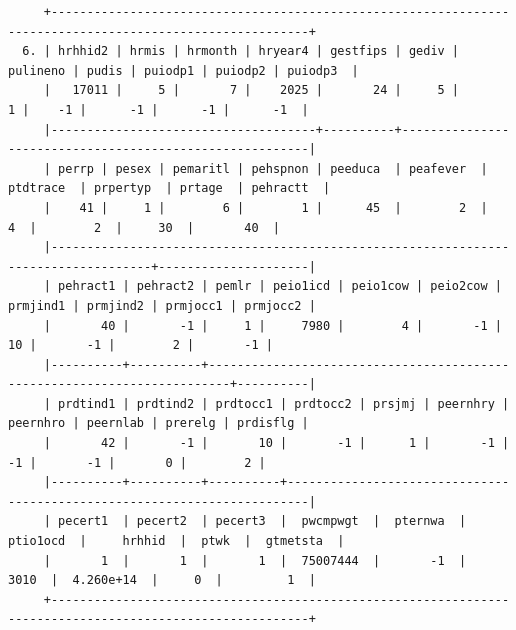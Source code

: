 \documentclass[
]{book}
\begin{document}
\begin{verbatim}
     +----------------------------------------------------------------------------------------------------------+
  6. | hrhhid2 | hrmis | hrmonth | hryear4 | gestfips | gediv | pulineno | pudis | puiodp1 | puiodp2 | puiodp3  |
     |   17011 |     5 |       7 |    2025 |       24 |     5 |        1 |    -1 |      -1 |      -1 |      -1  |
     |-------------------------------------+----------+---------------------------------------------------------|
     | perrp | pesex | pemaritl | pehspnon | peeduca  | peafever  | ptdtrace  | prpertyp  | prtage  | pehractt  |
     |    41 |     1 |        6 |        1 |      45  |        2  |        4  |        2  |     30  |       40  |
     |------------------------------------------------------------------------------------+---------------------|
     | pehract1 | pehract2 | pemlr | peio1icd | peio1cow | peio2cow | prmjind1 | prmjind2 | prmjocc1 | prmjocc2 |
     |       40 |       -1 |     1 |     7980 |        4 |       -1 |       10 |       -1 |        2 |       -1 |
     |----------+----------+-------------------------------------------------------------------------+----------|
     | prdtind1 | prdtind2 | prdtocc1 | prdtocc2 | prsjmj | peernhry | peernhro | peernlab | prerelg | prdisflg |
     |       42 |       -1 |       10 |       -1 |      1 |       -1 |       -1 |       -1 |       0 |        2 |
     |----------+----------+----------+-------------------------------------------------------------------------|
     | pecert1  | pecert2  | pecert3  |  pwcmpwgt  |  pternwa  |  ptio1ocd  |     hrhhid  |  ptwk  |  gtmetsta  |
     |       1  |       1  |       1  |  75007444  |       -1  |      3010  |  4.260e+14  |     0  |         1  |
     +----------------------------------------------------------------------------------------------------------+


\end{verbatim}
\end{document}
